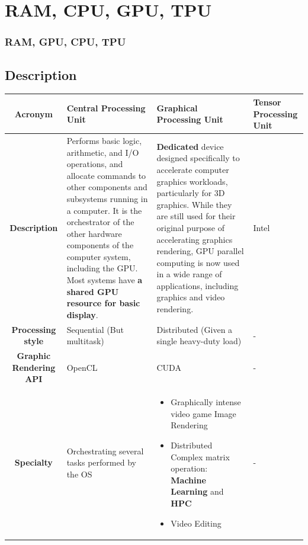 \documentclass[11pt]{beamer}
\begin{document}
\section{RAM, CPU, GPU, TPU}
\begin{frame}
	\frametitle{RAM, GPU, CPU, TPU}
	\subsection{Description}
	\begin{center}
		\tiny
	\begin{tabular}{| c | p{2.5cm}| p{2.5cm} | p{2.5cm} | }
		\hline
		\textbf{Acronym} & Central Processing Unit  & Graphical Processing Unit& Tensor Processing Unit \\
		\hline
		\textbf{Description} & Performs basic logic, arithmetic, and I/O operations, and allocate commands to other components and subsystems running in a computer. It is the orchestrator of the other hardware components of the computer system, including the GPU. Most systems have \textbf{a shared GPU resource for basic display}.& \textbf{Dedicated} device designed specifically to accelerate computer graphics workloads, particularly for 3D graphics. While they are still used for their original purpose of accelerating graphics rendering, GPU parallel computing is now used in a wide range of applications, including graphics and video rendering.  & Intel   \\
		\hline
		\textbf{Processing style} & Sequential (But multitask) & Distributed (Given a single heavy-duty load)  & -  \\
		\hline
		\textbf{Graphic Rendering API} & OpenCL& CUDA  & -  \\
		\hline
		\textbf{Specialty} & Orchestrating several tasks performed by the OS &	\begin{itemize}
			\item Graphically intense video game Image Rendering
			\item Distributed Complex matrix operation: \textbf{Machine Learning} and \textbf{HPC}
			\item Video Editing 
		\end{itemize} & -  \\
		\hline  
	\end{tabular}
\end{center}
\end{frame}
\end{document}
